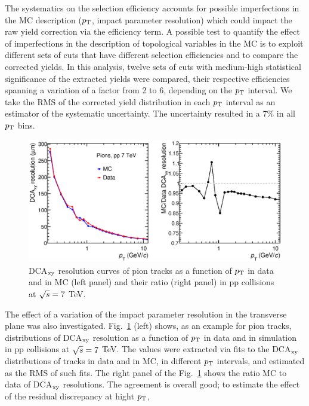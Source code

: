 The systematics on the selection efficiency accounts for 
possible imperfections in the MC description ($p_{\rm T}$, 
impact parameter resolution) which could 
impact the raw yield correction via the efficiency term.
A possible test to quantify the effect of imperfections in the 
description of topological variables in the MC is to exploit different sets of cuts
that have different selection efficiencies and to compare the corrected
yields. In this analysis, twelve sets of cuts with 
medium-high statistical significance of the extracted yields were compared, 
their respective efficiencies spanning a variation of
a factor from 2 to 6, depending on the $p_{\rm T}$ interval. We take the RMS 
of the corrected yield distribution in each $p_{\rm T}$ interval as an estimator of 
the systematic uncertainty. The uncertainty resulted in a 7\% in all $p_{\rm T}$ bins.
\begin{figure}[!b]
\begin{center}
 \includegraphics[width=1\textwidth]{FigCap4/DCAxyReso_Pions.eps}
\caption{DCA$_{\rm xy}$ resolution curves of pion tracks as a function of $p_{\rm T}$ in data and in MC (left panel) and their ratio (right panel) in pp collisions at $\sqrt{s} = 7 $ TeV.}             
\label{fig:DCAxyReso}
\end{center}
\end{figure}
The effect of a variation of the impact parameter resolution in the transverse plane
was also investigated. Fig.~\ref{fig:DCAxyReso} (left) shows, as an example for pion tracks, distributions of
DCA$_{\rm xy}$ resolution as a function of $p_{\rm T}$ in data and in simulation 
in pp collisions at $\sqrt{s} = 7 $ TeV. The values were extracted via fits to the DCA$_{\rm xy}$ distributions
of tracks in data and in MC, in different $p_{\rm T}$ intervals, and estimated as the RMS of
such fits. The right panel of the Fig.~\ref{fig:DCAxyReso} shows the ratio MC to data of DCA$_{\rm xy}$ resolutions. 
The agreement is overall good; to estimate the effect of the residual discrepancy at hight $p_{\rm T}$,
